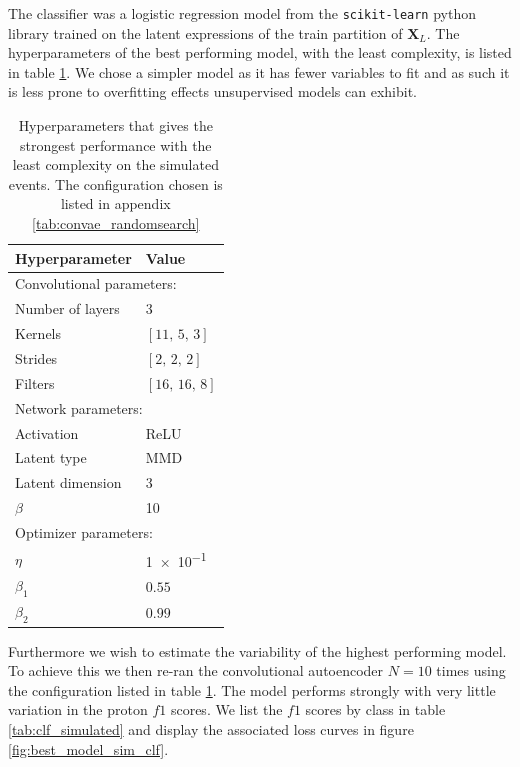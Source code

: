 The classifier was a logistic regression model from the \lstinline{scikit-learn} python library trained on the latent expressions of the train partition of $\mathbf{X}_L$. The hyperparameters of the best performing model, with the least complexity, is listed in table \ref{tab:param_vals_sim_convae}. We chose a simpler model as it has fewer variables to fit and as such it is less prone to overfitting effects unsupervised models can exhibit. 


\begin{table}
\centering
\setlength{\extrarowheight}{15pt}
\hspace*{-0.5in}
\begin{tabular}{ll}
\toprule
Hyperparameter & Value \\
\midrule
\multicolumn{2}{l}{Convolutional parameters: } \\
\midrule
Number of layers & 3\\
Kernels & $[11,\, 5,\, 3]$\\
Strides & $[2,\, 2,\, 2]$\\
Filters & $[16,\, 16,\, 8]$ \\ 
\midrule
\multicolumn{2}{l}{Network parameters: } \\
\midrule
Activation & ReLU \\
Latent type & MMD \\
Latent dimension & $3$ \\
$\beta$ & \num{10} \\
\midrule
\multicolumn{2}{l}{Optimizer parameters: } \\
\midrule
$\eta$ &  \num{1e-1} \\
$\beta_1$ & $0.55$ \\
$\beta_2$ & $0.99$ \\
\bottomrule
\end{tabular}
\caption{Hyperparameters that gives the strongest performance with the least complexity on the simulated events. The configuration chosen is listed in appendix \ref{tab:convae_randomsearch}}\label{tab:param_vals_sim_convae}
\end{table}

Furthermore we wish to estimate the variability of the highest performing model. To achieve this we then re-ran the convolutional autoencoder $N=10$ times using the configuration listed in table \ref{tab:param_vals_sim_convae}. The model performs strongly with very little variation in the proton $f1$ scores. We list the $f1$ scores by class in table \ref{tab:clf_simulated} and display the associated loss curves in figure \ref{fig:best_model_sim_clf}.

